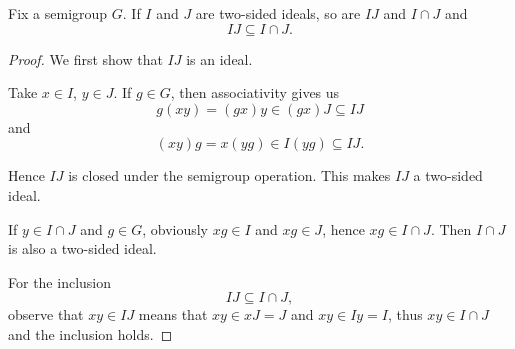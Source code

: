 \begin{proposition}\label{thm:product_of_semigroup_ideals_is_in_intersection}
  Fix a semigroup \( G \). If \( I \) and \( J \) are two-sided ideals, so are \( IJ \) and \( I \cap J \) and
  \begin{equation*}
    IJ \subseteq I \cap J.
  \end{equation*}
\end{proposition}
\begin{proof}
  We first show that \( IJ \) is an ideal.

  Take \( x \in I \), \( y \in J \). If \( g \in G \), then associativity gives us
  \begin{equation*}
    g(xy) = (gx)y \in (gx)J \subseteq IJ
  \end{equation*}
  and
  \begin{equation*}
    (xy)g = x(yg) \in I(yg) \subseteq IJ.
  \end{equation*}

  Hence \( IJ \) is closed under the semigroup operation. This makes \( IJ \) a two-sided ideal.

  If \( y \in I \cap J \) and \( g \in G \), obviously \( xg \in I \) and \( xg \in J \), hence \( xg \in I \cap J \). Then \( I \cap J \) is also a two-sided ideal.

  For the inclusion
  \begin{equation*}
    IJ \subseteq I \cap J,
  \end{equation*}
  observe that \( xy \in IJ \) means that \( xy \in xJ = J \) and \( xy \in Iy = I \), thus \( xy \in I \cap J \) and the inclusion holds.
\end{proof}
